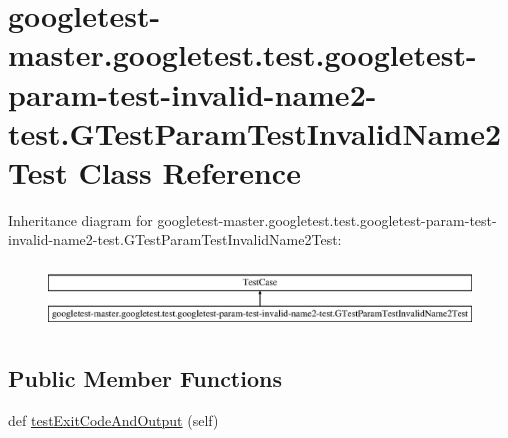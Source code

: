 \hypertarget{classgoogletest-master_1_1googletest_1_1test_1_1googletest-param-test-invalid-name2-test_1_1_g_tff88aa7127808d8f576f122583350856}{}\section{googletest-\/master.googletest.\+test.\+googletest-\/param-\/test-\/invalid-\/name2-\/test.G\+Test\+Param\+Test\+Invalid\+Name2\+Test Class Reference}
\label{classgoogletest-master_1_1googletest_1_1test_1_1googletest-param-test-invalid-name2-test_1_1_g_tff88aa7127808d8f576f122583350856}
Inheritance diagram for googletest-\/master.googletest.\+test.\+googletest-\/param-\/test-\/invalid-\/name2-\/test.G\+Test\+Param\+Test\+Invalid\+Name2\+Test\+:\begin{figure}[H]
\begin{center}
\leavevmode
\includegraphics[height=1.744548cm]{d8/d05/classgoogletest-master_1_1googletest_1_1test_1_1googletest-param-test-invalid-name2-test_1_1_g_tff88aa7127808d8f576f122583350856}
\end{center}
\end{figure}
\subsection*{Public Member Functions}
\begin{DoxyCompactItemize}
\item 
def \mbox{\hyperlink{classgoogletest-master_1_1googletest_1_1test_1_1googletest-param-test-invalid-name2-test_1_1_g_tff88aa7127808d8f576f122583350856_a4848b8f8a798a0bcb9321dc359b70f9d}{test\+Exit\+Code\+And\+Output}} (self)
\end{DoxyCompactItemize}


